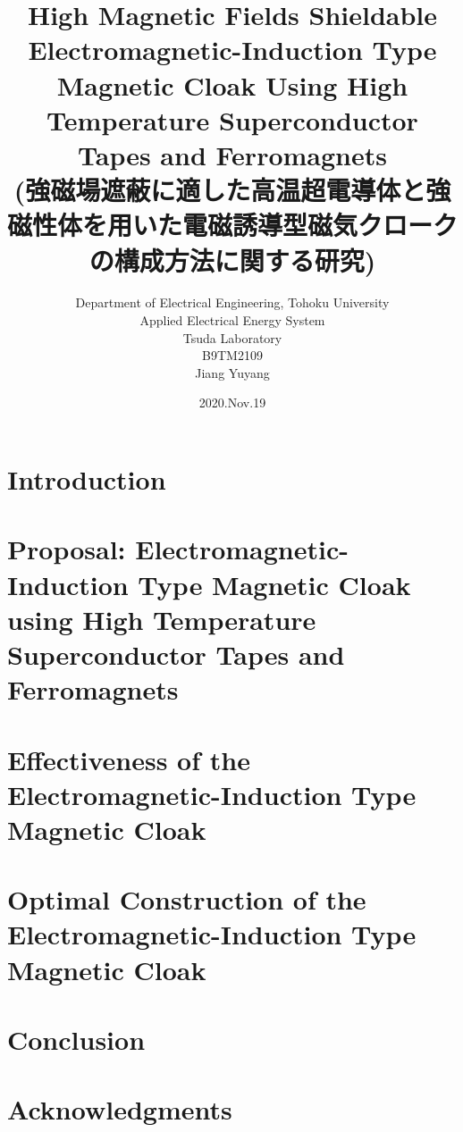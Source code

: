 \documentclass[titlepage, dvipdfmx, 12pt]{article}
\title{High Magnetic Fields Shieldable Electromagnetic-Induction Type Magnetic Cloak Using High Temperature Superconductor Tapes and Ferromagnets\\
(強磁場遮蔽に適した高温超電導体と強磁性体を用いた電磁誘導型磁気クロークの構成方法に関する研究)}
\author{Department of Electrical Engineering, Tohoku University\\
Applied Electrical Energy System\\
Tsuda Laboratory\\
B9TM2109\\
Jiang Yuyang
}
\date{2020.Nov.19}
\begin{document}
\renewcommand{\figurename}{Fig.}
\renewcommand{\tablename}{Tab.}
% 



\setcounter{tocdepth}{3}
\tableofcontents
\baselineskip=8mm
\newpage


\section{Introduction}


\newpage
\section{Proposal: Electromagnetic-Induction Type Magnetic Cloak using High Temperature Superconductor Tapes and Ferromagnets}


\newpage
\section{Effectiveness of the Electromagnetic-Induction Type Magnetic Cloak}


\newpage
\section{Optimal Construction of the Electromagnetic-Induction Type Magnetic Cloak}




\newpage
\section{Conclusion}


\newpage
\section*{Acknowledgments}

\end{document}
